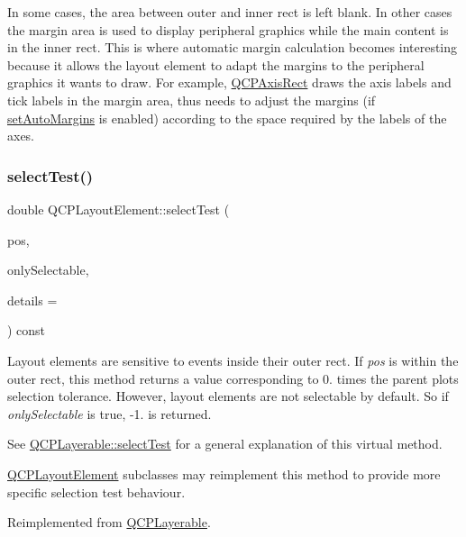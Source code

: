 In some cases, the area between outer and inner rect is left blank. In other cases the margin area is used to display peripheral graphics while the main content is in the inner rect. This is where automatic margin calculation becomes interesting because it allows the layout element to adapt the margins to the peripheral graphics it wants to draw. For example, \hyperlink{class_q_c_p_axis_rect}{Q\+C\+P\+Axis\+Rect} draws the axis labels and tick labels in the margin area, thus needs to adjust the margins (if \hyperlink{class_q_c_p_layout_element_accfda49994e3e6d51ed14504abf9d27d}{set\+Auto\+Margins} is enabled) according to the space required by the labels of the axes. \hypertarget{class_q_c_p_layout_element_a0b96ae0d7bcfa6e38188fcb1e73e143f}{}\label{class_q_c_p_layout_element_a0b96ae0d7bcfa6e38188fcb1e73e143f} 
\subsubsection{\texorpdfstring{select\+Test()}{selectTest()}}
{\footnotesize\ttfamily double Q\+C\+P\+Layout\+Element\+::select\+Test (\begin{DoxyParamCaption}\item[{const Q\+PointF \&}]{pos,  }\item[{bool}]{only\+Selectable,  }\item[{Q\+Variant $\ast$}]{details = {} }\end{DoxyParamCaption}) const\hspace{0.3cm}{\ttfamily [virtual]}}

Layout elements are sensitive to events inside their outer rect. If {\itshape pos} is within the outer rect, this method returns a value corresponding to 0. times the parent plot\textquotesingle{}s selection tolerance. However, layout elements are not selectable by default. So if {\itshape only\+Selectable} is true, -\/1. is returned.

See \hyperlink{class_q_c_p_layerable_a04db8351fefd44cfdb77958e75c6288e}{Q\+C\+P\+Layerable\+::select\+Test} for a general explanation of this virtual method.

\hyperlink{class_q_c_p_layout_element}{Q\+C\+P\+Layout\+Element} subclasses may reimplement this method to provide more specific selection test behaviour. 

Reimplemented from \hyperlink{class_q_c_p_layerable_a04db8351fefd44cfdb77958e75c6288e}{Q\+C\+P\+Layerable}.



